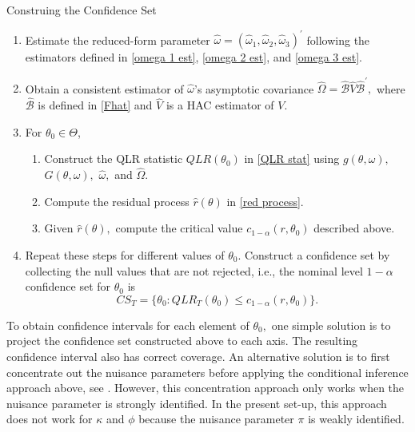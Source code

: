 \begin{algorithm}
    \caption{Construing the Confidence Set}
    \label{alg:constructing_the_cs}
    
    \begin{enumerate}
        \item Estimate the reduced-form parameter $\widehat{\omega }=( \widehat{\omega }_{1},\widehat{\omega }_{2},\widehat{\omega }_{3})^{\prime }$ following the estimators defined in \cref{omega 1 est}, \cref{omega 2 est}, and  \cref{omega 3 est}.
%
        \item Obtain a consistent estimator of $\widehat{\omega}$'s asymptotic covariance $\widehat{ \Omega }=\widehat{\mathcal{B}}\widehat{V}\widehat{\mathcal{B}}^{\prime },$ where $\widehat{\mathcal{B}}$ is defined in \cref{Fhat} and $\widehat{V}$ is a HAC estimator of $V.$

        \item For $\theta _{0}\in \Theta$,
%
        \begin{enumerate}
            \item Construct the QLR statistic $QLR(\theta _{0})$ in \cref{QLR stat} using $g(\theta ,\omega ),$ $G(\theta ,\omega ),$ $\widehat{\omega },$ and $\widehat{\Omega }.$
%
            \item Compute the residual process $\widehat{r}(\theta )$ in \cref{red process}.

            \item Given $\widehat{r}(\theta ),$ compute the critical value $c_{1-\alpha }(r,\theta _{0})$ described above.
%
        \end{enumerate}
%
        \item Repeat these steps for different values of $\theta _{0}$.  Construct a confidence set by collecting the null values that are not rejected, i.e., the nominal level $1-\alpha $ confidence set for $\theta _{0}$ is
%
            \begin{equation*}
                CS_{T}=\{ \theta _{0}:QLR_{T}(\theta _{0})\leq c_{1-\alpha }(r,\theta_{0})\}.
            \end{equation*}
    \end{enumerate}
\end{algorithm}

To obtain confidence intervals for each element of $\theta _{0},$ one simple solution is to project the confidence set constructed above to each axis. The resulting confidence interval also has correct coverage. An alternative solution is to first concentrate out the nuisance parameters before applying the conditional inference approach above, see \textcite[Section 5]{andrews2016conditional}.  However, this concentration approach only works when the nuisance parameter is strongly identified. In the present set-up, this approach does not work for $\kappa $ and $\phi $ because the nuisance parameter $\pi $ is weakly identified.  


